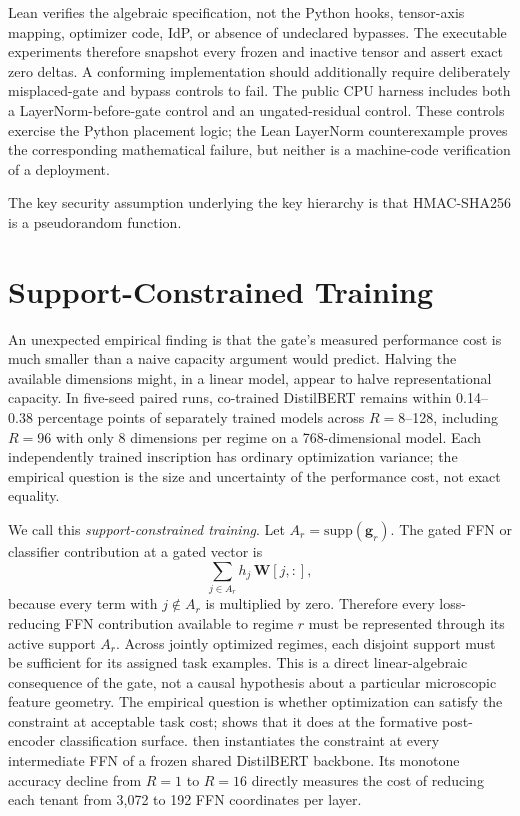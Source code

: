\documentclass[11pt,a4paper]{article}
\newcommand{\bW}{\mathbf{W}}
\newcommand{\bg}{\mathbf{g}}
\begin{document}
Lean verifies the algebraic specification, not the Python hooks,
tensor-axis mapping, optimizer code, IdP, or absence of undeclared
bypasses.  The executable experiments therefore snapshot every
frozen and inactive tensor and assert exact zero deltas.  A conforming
implementation should additionally require deliberately misplaced-gate
and bypass controls to fail.  The public CPU harness includes both a
LayerNorm-before-gate control and an ungated-residual control.  These
controls exercise the Python placement logic; the Lean LayerNorm
counterexample proves the corresponding mathematical failure, but
neither is a machine-code verification of a deployment.

The key security assumption underlying the key hierarchy is
that HMAC-SHA256 is a pseudorandom function.

\section{Support-Constrained Training}
\label{sec:superposition}

An unexpected empirical finding is that the gate's measured
performance cost is much smaller than a naive capacity argument
would predict.  Halving the available dimensions might, in a linear
model, appear to halve representational capacity.  In five-seed
paired runs, co-trained DistilBERT remains within 0.14--0.38
percentage points of separately trained models across
$R{=}8$--128, including $R{=}96$ with only 8 dimensions per regime
on a 768-dimensional model.  Each independently trained inscription
has ordinary optimization variance; the empirical question is the
size and uncertainty of the performance cost, not exact equality.

We call this \emph{support-constrained training}.  Let
$A_r=\mathrm{supp}(\bg_r)$.  The gated FFN
or classifier contribution at a gated vector is
\[
  \sum_{j\in A_r} h_j\,\bW[j,:],
\]
because every term with $j\notin A_r$ is multiplied by zero.
Therefore every loss-reducing FFN contribution available to regime
$r$ must be represented through its active support $A_r$.  Across
jointly optimized regimes, each disjoint support must be sufficient
for its assigned task examples.  This is a direct linear-algebraic
consequence of the gate, not a causal hypothesis about a particular
microscopic feature geometry.  The empirical question is whether
optimization can satisfy the constraint at acceptable task cost;
 shows that it does at the formative post-encoder
classification surface.   then instantiates
the constraint at every intermediate FFN of a frozen shared
DistilBERT backbone.  Its monotone accuracy decline from $R{=}1$ to
$R{=}16$ directly measures the cost of reducing each tenant from
3,072 to 192 FFN coordinates per layer.
\end{document}
